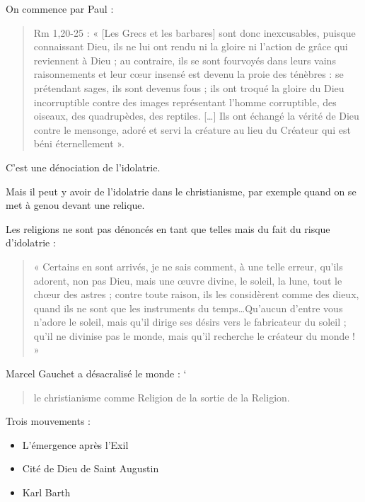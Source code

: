  On commence par Paul :
 \begin{quote}
     Rm 1,20-25 : « [Les Grecs et les barbares] sont donc inexcusables, puisque connaissant Dieu, ils ne lui
ont rendu ni la gloire ni l’action de grâce qui reviennent à Dieu ; au contraire, ils se sont fourvoyés
dans leurs vains raisonnements et leur cœur insensé est devenu la proie des ténèbres : se prétendant
sages, ils sont devenus fous ; ils ont troqué la gloire du Dieu incorruptible contre des images
représentant l’homme corruptible, des oiseaux, des quadrupèdes, des reptiles. […] Ils ont échangé la
vérité de Dieu contre le mensonge, adoré et servi la créature au lieu du Créateur qui est béni
éternellement ».

 \end{quote}
C'est une dénociation de l'idolatrie.
\begin{Ex}
Mais il peut y avoir de l'idolatrie dans le christianisme, par exemple quand on se met à genou devant une relique.
\end{Ex}

Les religions ne sont pas dénoncés en tant que telles mais du fait du risque d'idolatrie : 

\begin{quote}
    « Certains en sont arrivés, je ne sais comment, à une telle erreur, qu’ils adorent, non pas Dieu, mais
une œuvre divine, le soleil, la lune, tout le chœur des astres ; contre toute raison, ils les considèrent
comme des dieux, quand ils ne sont que les instruments du temps…Qu’aucun d’entre vous n’adore le
soleil, mais qu’il dirige ses désirs vers le fabricateur du soleil ; qu’il ne divinise pas le monde, mais
qu’il recherche le créateur du monde ! » 
\end{quote}

Marcel Gauchet  a désacralisé le monde : 
`\begin{quote}
    le christianisme comme Religion de la sortie de la Religion. 
\end{quote}



Trois mouvements : 
\begin{itemize}
    \item L'émergence après l'Exil
    \item Cité de Dieu de Saint Augustin
    \item Karl Barth
\end{itemize}

